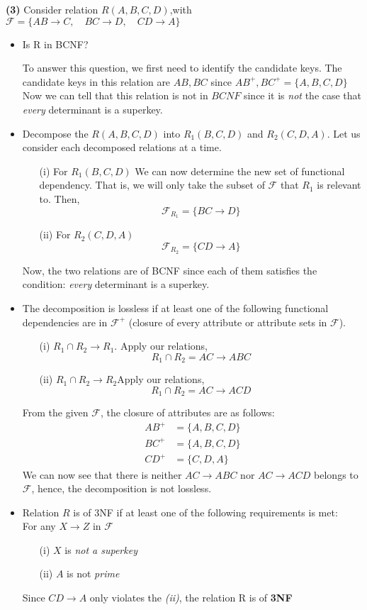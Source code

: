 \documentclass[a4paper, 11pt]{article}
\renewcommand{\part}[1] {\vspace{.10in} {\bf (#1)}}
\begin{document}
\part{3} Consider relation $R(A,B,C,D)$,with $\mathcal{F} = \{ AB \rightarrow C, \quad BC \rightarrow D, \quad CD \rightarrow A \} $
\begin{itemize}
	\item Is R in BCNF? 
	
	To answer this question, we first need to identify the candidate keys. The candidate keys in this relation  are $  AB, BC$ since  $ AB^+, BC^+ = \{ A,B,C,D \}$ Now we can tell that this relation is not in $BCNF$ since it is \textit{not} the case that  \textit{ every} determinant is a superkey.\
	\item Decompose the  $R(A,B,C,D)$ into $R_1(B,C,D)$ and $R_2(C,D,A)$. Let us consider each decomposed relations at a time.
	\begin{itemize}
	\item[(i)] For $R_1(B,C,D)$ We can now determine the new set of functional dependency. That is, we will only take the subset of $\mathcal{F}$ that $R_1$ is relevant to. Then,
	$$\mathcal{F}_{R_1} = \{BC \rightarrow D \}$$ 
	\item[(ii)] For $R_2(C,D,A)$
	$$\mathcal{F}_{R_2} = \{CD \rightarrow A \}$$ 
\end{itemize}	 
Now, the two relations are of BCNF since each of them satisfies the condition:  \textit{ every} determinant is a superkey.
\item The decomposition is lossless if at least one of the following functional
dependencies are in $\mathcal{F}^+$ (closure of every attribute or attribute sets in  $\mathcal{F}$). 
\begin{itemize}
\item[(i)] $R_1 \cap R_2 \rightarrow R_1$. Apply our relations,
$$
R_1 \cap R_2 = AC \rightarrow ABC
$$
\item[(ii)] 
$R_1 \cap R_2 \rightarrow R_2$Apply our relations,
$$
R_1 \cap R_2 = AC \rightarrow ACD
$$
\end{itemize}
From the given $\mathcal{F}$, the closure of attributes are as follows:
\begin{align*}
AB^+ &= \{A, B,C,D \}\\
BC^+ &= \{A,B,C,D \}\\
CD^+ &=\{C,D,A\}
\end{align*} 
We can now see that there is  neither $AC \rightarrow ABC$ nor $AC \rightarrow ACD$ belongs to $\mathcal{F}$, hence, the decomposition is not lossless. 
\clearpage

\item Relation $R$ is of 3NF if at least one of the following requirements is met:\\
For any $X \rightarrow Z$ in $\mathcal{F}$
\begin{itemize}
\item[(i)] $X$ is \textit{not a superkey}
\item[(ii)] $A$ is not \textit{prime} 
\end{itemize}
Since $CD \rightarrow A $ only violates the \textit{(ii)}, the relation R is of \textbf{3NF}
\end{itemize}
\end{document}
